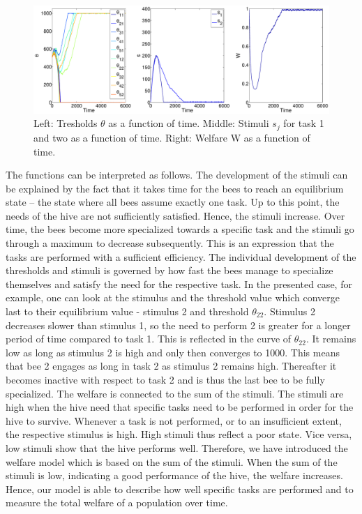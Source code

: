 \begin{figure}[ht!]
	\centerline{\includegraphics[width=1.25\textwidth]{figures/welstim.eps}}
	
	\caption{Left: Tresholds $\theta$ as a function of time. Middle: Stimuli $s_{j}$ for task 1 and two as a function of time. Right: Welfare W as a function of time.}
	\label{fig:welstim}
\end{figure}

The functions can be interpreted as follows. The development of the stimuli can be explained by the fact that it takes time for the bees to reach an equilibrium state -- the state where all bees assume exactly one task. Up to this point, the needs of the hive are not sufficiently satisfied. Hence, the stimuli increase. Over time, the bees become more specialized towards a specific task and the stimuli go through a maximum to decrease subsequently. This is an expression that the tasks are performed with a sufficient efficiency. The individual development of the thresholds and stimuli is governed by how fast the bees manage to specialize themselves and satisfy the need for the respective task. In the presented case, for example, one can look at the stimulus and the threshold value which converge last to their equilibrium value - stimulus 2 and threshold $\theta_{22}$. Stimulus 2 decreases slower than stimulus 1, so the need to perform 2 is greater for a longer period of time compared to task 1. This is reflected in the curve of $\theta_{22}$. It remains low as long as stimulus 2 is high and only then converges to 1000. This means that bee 2 engages as long in task 2 as stimulus 2 remains high. Thereafter it becomes inactive with respect to task 2 and is thus the last bee to be fully specialized. The welfare is connected to the sum of the stimuli. The stimuli are high when the hive need that specific tasks need to be performed in order for the hive to survive. Whenever a task is not performed, or to an insufficient extent, the respective stimulus is high. High stimuli thus reflect a poor state. Vice versa, low stimuli show that the hive performs well. Therefore, we have introduced the welfare model which is based on the sum of the stimuli. When the sum of the stimuli is low, indicating a good performance of the hive, the welfare increases. Hence, our model is able to describe how well specific tasks are performed and to measure the total welfare of a population over time.

